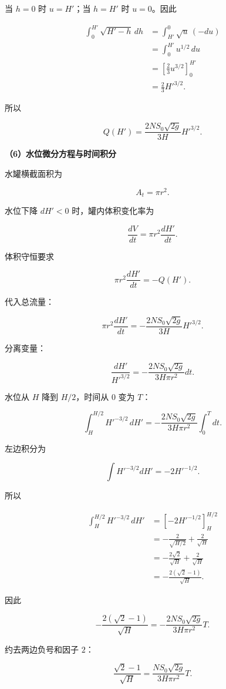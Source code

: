 \documentclass[12pt,a4paper,UTF8]{ctexart}
\begin{document}
当 \(h=0\) 时 \(u=H'\)；当 \(h=H'\) 时 \(u=0\)。因此

\[\begin{aligned}
\int_0^{H'}\sqrt{H'-h}\,dh
&=\int_{H'}^0\sqrt u\,(-du)\\
&=\int_0^{H'}u^{1/2}\,du\\
&=\left[\frac23u^{3/2}\right]_0^{H'}\\
&=\frac23H'^{3/2}.
\end{aligned}\]

所以

\[\boxed{
Q(H')
=\frac{2NS_0\sqrt{2g}}{3H}
H'^{3/2}
}.\]

\textbf{（6）水位微分方程与时间积分}

水罐横截面积为

\[A_t=\pi r^2.\]

水位下降 \(dH'<0\) 时，罐内体积变化率为

\[\frac{dV}{dt}
=\pi r^2\frac{dH'}{dt}.\]

体积守恒要求

\[\pi r^2\frac{dH'}{dt}
=-Q(H').\]

代入总流量：

\[\pi r^2\frac{dH'}{dt}
=-\frac{2NS_0\sqrt{2g}}{3H}
H'^{3/2}.\]

分离变量：

\[\frac{dH'}{H'^{3/2}}
=-\frac{2NS_0\sqrt{2g}}
{3H\pi r^2}dt.\]

水位从 \(H\) 降到 \(H/2\)，时间从 \(0\) 变为 \(T\)：

\[\int_H^{H/2}H'^{-3/2}\,dH'
=-\frac{2NS_0\sqrt{2g}}
{3H\pi r^2}
\int_0^Tdt.\]

左边积分为

\[\int H'^{-3/2}dH'=-2H'^{-1/2}.\]

所以

\[\begin{aligned}
\int_H^{H/2}H'^{-3/2}\,dH'
&=\left[-2H'^{-1/2}\right]_H^{H/2}\\
&=-\frac{2}{\sqrt{H/2}}+\frac2{\sqrt H}\\
&=-\frac{2\sqrt2}{\sqrt H}+\frac2{\sqrt H}\\
&=-\frac{2(\sqrt2-1)}{\sqrt H}.
\end{aligned}\]

因此

\[-\frac{2(\sqrt2-1)}{\sqrt H}
=-\frac{2NS_0\sqrt{2g}}
{3H\pi r^2}T.\]

约去两边负号和因子 \(2\)：

\[\frac{\sqrt2-1}{\sqrt H}
=\frac{NS_0\sqrt{2g}}
{3H\pi r^2}T.\]
\end{document}
